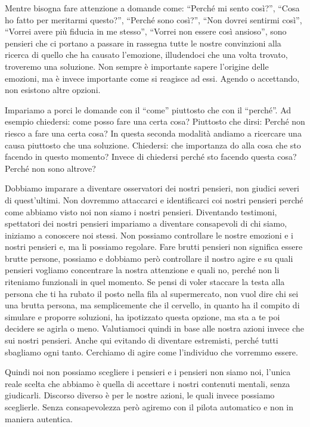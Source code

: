 \documentclass[12pt]{book} %
\begin{document}
Mentre bisogna fare attenzione a domande come: “Perché mi sento così?”, “Cosa ho fatto per meritarmi questo?”, “Perché
sono così?”, “Non dovrei sentirmi così”, “Vorrei avere più fiducia in me stesso”, “Vorrei non essere così ansioso”,
sono pensieri che ci portano a passare in rassegna tutte le nostre convinzioni alla ricerca di quello che ha causato
l'emozione, illudendoci che una volta trovato, troveremo una soluzione. Non sempre è importante
sapere l'origine delle emozioni, ma è invece importante come si reagisce ad essi. Agendo o
accettando, non esistono altre opzioni.

Impariamo a porci le domande con il “come” piuttosto che con il “perché”. Ad esempio chiedersi: come posso fare una
certa cosa? Piuttosto che dirsi: Perché non riesco a fare una certa cosa? In questa seconda modalità andiamo a
ricercare una causa piuttosto che una soluzione. Chiedersi: che importanza do alla cosa che sto facendo in questo momento?
Invece di chiedersi perché sto facendo questa cosa? Perché non sono altrove? 

Dobbiamo imparare a diventare osservatori dei nostri pensieri, non giudici severi di quest'ultimi. Non dovremmo
attaccarci e identificarci coi nostri pensieri perché come abbiamo visto noi non siamo i nostri pensieri. Diventando
testimoni, spettatori dei nostri pensieri impariamo a diventare consapevoli di chi siamo, iniziamo a conoscere noi
stessi. Non possiamo controllare le nostre emozioni e i nostri pensieri e, ma li possiamo regolare. Fare brutti
pensieri non significa essere brutte persone, possiamo e dobbiamo però controllare il nostro agire e su quali pensieri
vogliamo concentrare la nostra attenzione e quali no, perché non li riteniamo funzionali in quel momento. Se pensi di
voler staccare la testa alla persona che ti ha rubato il posto nella fila al supermercato, non vuol dire chi sei una
brutta persona, ma semplicemente che il cervello, in quanto ha il compito di simulare e proporre soluzioni, ha
ipotizzato questa opzione, ma sta a te poi decidere se agirla o meno. Valutiamoci quindi in base alle nostra azioni
invece che sui nostri pensieri. Anche qui evitando di diventare estremisti, perché tutti sbagliamo ogni tanto.
Cerchiamo di agire come l'individuo che vorremmo essere.

Quindi noi non possiamo scegliere i pensieri e i pensieri non siamo noi, l'unica reale scelta che
abbiamo è quella di accettare i nostri contenuti mentali, senza giudicarli. Discorso diverso è per le nostre azioni, le
quali invece possiamo sceglierle. Senza consapevolezza però agiremo con il pilota automatico e non in maniera
autentica.
\end{document}
